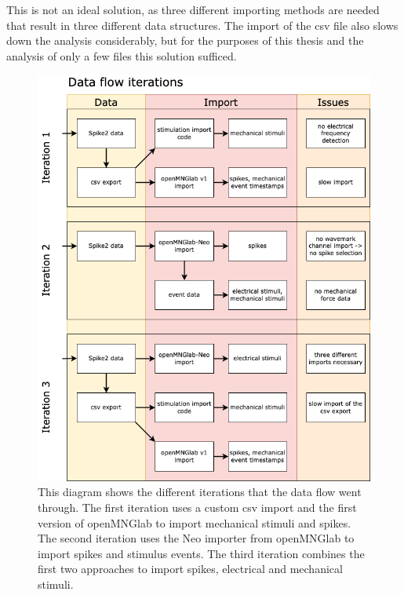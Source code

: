 This is not an ideal solution, as three different importing methods are needed that result in three different data structures. The import of the csv file also slows down the analysis considerably, but for the purposes of this thesis and the analysis of only a few files this solution sufficed.
\begin{figure}
	\includegraphics[width = \textwidth]{src/pic/Data_flow_iteration_vert}
	\caption{This diagram shows the different iterations that the data flow went through. The first iteration uses a custom csv import and the first version of openMNGlab to import mechanical stimuli and spikes. The second iteration uses the Neo importer from openMNGlab to import spikes and stimulus events. The third iteration combines the first two approaches to import spikes, electrical and mechanical stimuli.}
	\label{fig:import_iteration}
\end{figure}


